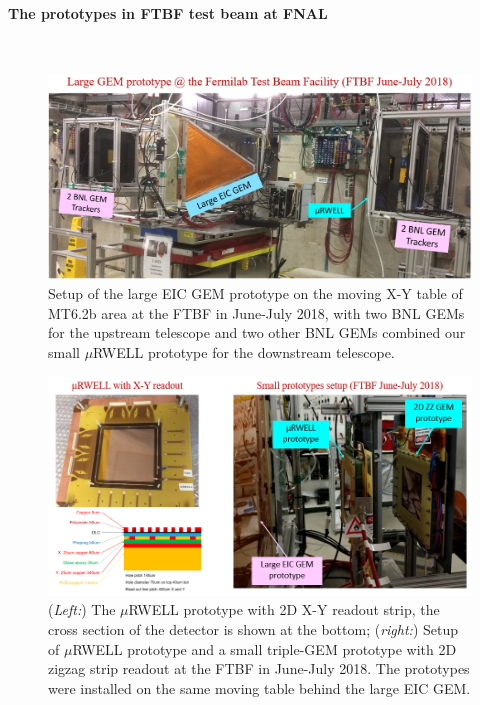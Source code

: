 \paragraph*{The prototypes in FTBF test beam at FNAL}\mbox{}\\
%
\begin{figure}[htb]
\centering
\includegraphics[width=1\columnwidth,trim={0pt 0mm 0pt 0mm},clip]{UVa_plots/ftbfSetup}
\caption{\label{fig:ftbfSetup} Setup of the large EIC GEM prototype on the moving X-Y table of MT6.2b area at the FTBF in June-July 2018, with two BNL GEMs for the upstream telescope and two other BNL GEMs combined our  small $\mu$RWELL prototype for the downstream telescope.}
\end{figure}
\begin{figure}[htb]
\includegraphics[width=1\columnwidth,trim={0pt 0mm 0pt 0mm},clip]{UVa_plots/ftbfSmallSetup}
\caption{\label{fig:ftbfSmallSetup} ({\it Left:}) The $\mu$RWELL prototype with 2D X-Y readout strip, the cross section of the detector is shown at the bottom; ({\it right:}) Setup of $\mu$RWELL  prototype and a small triple-GEM prototype with 2D zigzag strip readout at the FTBF in June-July 2018. The prototypes were installed on the same moving table behind the large EIC GEM.}
\end{figure}
